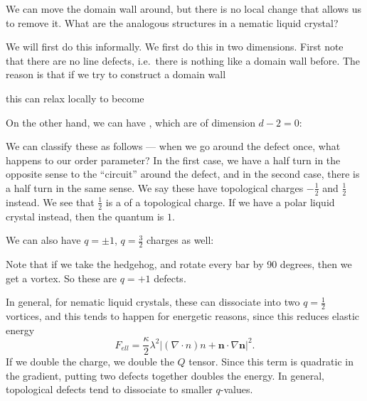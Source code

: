 \documentclass[a4paper]{article}
\begin{document}

We can move the domain wall around, but there is no local change that allows us to remove it. What are the analogous structures in a nematic liquid crystal?

We will first do this informally. We first do this in two dimensions. First note that there are no line defects, i.e.\ there is nothing like a domain wall before. The reason is that if we try to construct a domain wall

this can relax locally to become 


On the other hand, we can have , which are of dimension $d - 2 = 0$:


We can classify these as follows --- when we go around the defect once, what happens to our order parameter? In the first case, we have a half turn in the opposite sense to the ``circuit'' around the defect, and in the second case, there is a half turn in the same sense. We say these have topological charges $-\frac{1}{2}$ and $\frac{1}{2}$ instead. We see that $\frac{1}{2}$ is a  of a topological charge. If we have a polar liquid crystal instead, then the quantum is $1$.

We can also have $q = \pm 1$, $q = \frac{3}{2}$ charges as well:

\begin{center}
\end{center}

Note that if we take the hedgehog, and rotate every bar by 90 degrees, then we get a vortex. So these are $q = +1$ defects.

In general, for nematic liquid crystals, these can dissociate into two $q = \frac{1}{2}$ vortices, and this tends to happen for energetic reasons, since this reduces elastic energy
\[
  F_{ell} = \frac{\kappa}{2} \lambda^2 |(\nabla \cdot n)n + \mathbf{n} \cdot \nabla \mathbf{n}|^2.
\]
If we double the charge, we double the $Q$ tensor. Since this term is quadratic in the gradient, putting two defects together doubles the energy. In general, topological defects tend to dissociate to smaller $q$-values. 

\printindex
\end{document}
